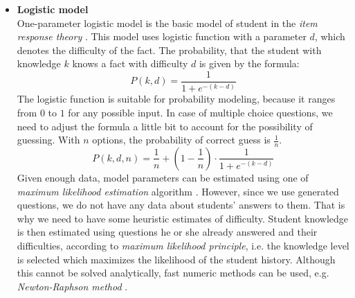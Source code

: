 \documentclass[12pt, twoside]{fithesis2}
\renewcommand{\_}{\leavevmode \kern0.07em\vbox{\hrule width0.4em}}
\newcommand{\squarebullet}{\textcolor{black}{\raisebox{0.15em}{\rule{4pt}{4pt}}}}
\newcommand{\emptysquarebullet}{\textcolor{black}{\raisebox{0.10em}{\tiny$\square$}}}
\newenvironment{myItemize}{
  \begin{itemize}[leftmargin=2em,rightmargin=1em,itemsep=\parskip ,parsep=0em,topsep=0em,partopsep=0em]
  \renewcommand{\labelitemi}{\squarebullet}
  \renewcommand{\labelitemii}{\textbullet}
}{
  \end{itemize}
}
\newcounter{choice}
\begin{document}
\begin{myItemize}
\item \textbf{Logistic model}\\
  One-parameter logistic model is the basic model of student in the
  \emph{item response theory} \cite{visual-irt}.
  This model uses logistic function with a parameter $d$, which denotes the difficulty of the fact.
  The probability, that the student with knowledge $k$ knows a fact with difficulty $d$ is given by the formula:
  \begin{equation}\label{eq:logistic}
  P(k, d) = \frac{1}{1 + e^{-(k - d)}}
  \end{equation}
  The logistic function is suitable for probability modeling, because it ranges from $0$ to $1$ for any possible input.
  In case of multiple choice questions, we need to adjust the formula a little bit to account for the possibility of guessing.
  With $n$ options, the probability of correct guess is $\frac{1}{n}$.
\begin{equation}\label{eq:logistic-mcq}
P(k, d, n) = \frac{1}{n} + \left( 1 - \frac{1}{n} \right) \cdot \frac{1}{1 + e^{-(k - d)}}
\end{equation}
Given enough data, model parameters can be estimated using
one of \emph{maximum likelihood estimation} algorithm \cite{irt-theory-and-practice}.
However, since we use generated questions, we do not have any data about students' answers to them.
That is why we need to have some heuristic estimates of difficulty.
Student knowledge is then estimated using questions he or she already answered and their difficulties,
according to \emph{maximum likelihood principle}, i.e. the knowledge level is selected which maximizes the likelihood of the student history.
Although this cannot be solved analytically, fast numeric methods can be used,
e.g. \emph{Newton-Raphson method} \cite{irt-ability-estimation}.

\begin{figure}[h]
  \centering


\end{figure}
\end{myItemize}
\end{document}
